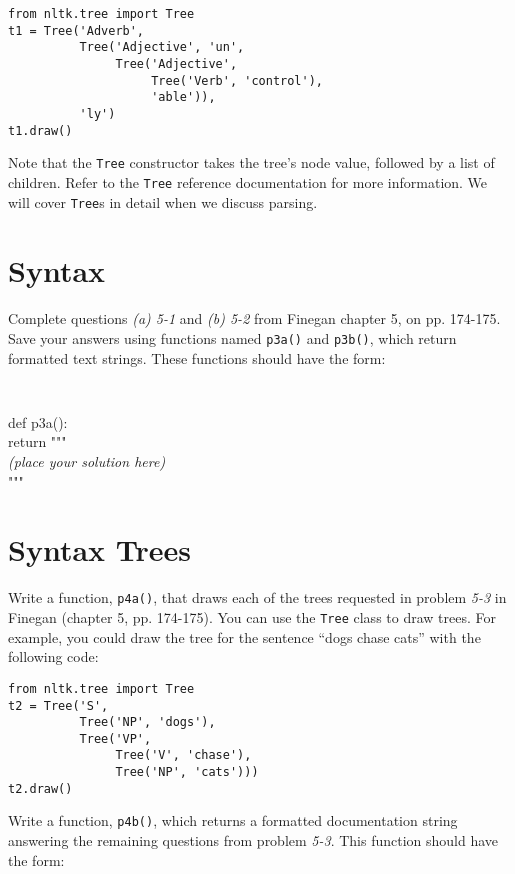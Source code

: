 \documentclass{cis530}
\begin{document}
\begin{verbatim}
from nltk.tree import Tree
t1 = Tree('Adverb',
          Tree('Adjective', 'un',
               Tree('Adjective',
                    Tree('Verb', 'control'),
                    'able')),
          'ly')
t1.draw()
\end{verbatim}

Note that the \texttt{Tree} constructor takes the tree's node value,
followed by a list of children.  Refer to the \texttt{Tree} reference
documentation for more information.  We will cover \texttt{Tree}s in
detail when we discuss parsing.

\section{Syntax}

Complete questions \emph{(a) 5-1} and \emph{(b) 5-2} from Finegan
chapter 5, on pp. 174-175.  Save your answers using functions named
\texttt{p3a()} and \texttt{p3b()}, which return formatted text
strings.  These functions should have the form:

{\tt
\begin{tabbing}
def p3a():\\
\qquad return """\\
\textit{(place your solution here)}\\
"""
\end{tabbing}
}

\section{Syntax Trees}

Write a function, \texttt{p4a()}, that draws each of the trees
requested in problem \emph{5-3} in Finegan (chapter 5, pp. 174-175).
You can use the \texttt{Tree} class to draw trees.  For example, you
could draw the tree for the sentence ``dogs chase cats'' with the
following code:

\begin{verbatim}
from nltk.tree import Tree
t2 = Tree('S',
          Tree('NP', 'dogs'),
          Tree('VP', 
               Tree('V', 'chase'),
               Tree('NP', 'cats')))
t2.draw()
\end{verbatim}

Write a function, \texttt{p4b()}, which returns a formatted
documentation string answering the remaining questions from problem
\emph{5-3}.  This function should have the form:
\end{document}
